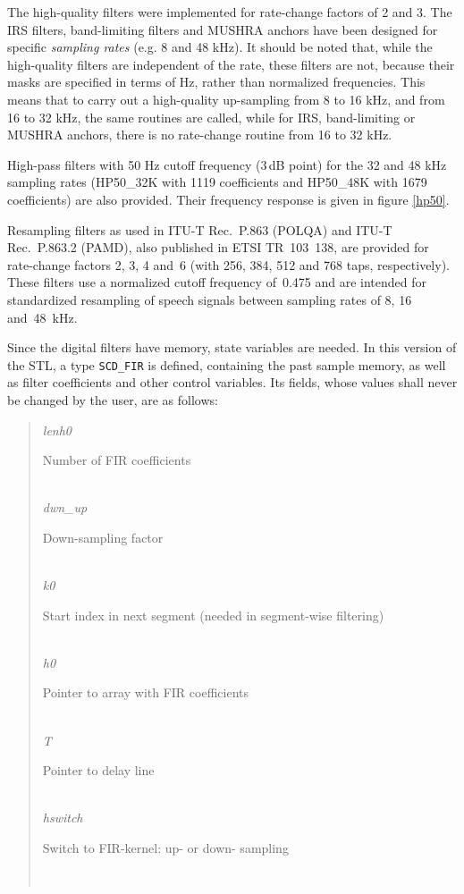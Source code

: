 The high-quality filters were implemented for rate-change factors
of 2 and 3. The IRS filters, band-limiting filters and MUSHRA
anchors have been designed for specific {\em sampling rates} (e.g.
8 and 48 kHz). It should be noted that, while the high-quality
filters are independent of the rate, these filters are not,
because their masks are specified in terms of Hz, rather than
normalized frequencies. This means that to carry out a
high-quality up-sampling from 8 to 16 kHz, and from 16 to 32 kHz,
the same routines are called, while for IRS, band-limiting or
MUSHRA anchors, there is no rate-change routine from 16 to 32 kHz.

High-pass filters with 50 Hz cutoff frequency (3\,dB point) for the 32 and 48 kHz sampling rates (HP50\_32K with 1119 coefficients and HP50\_48K with 1679 coefficients) are also provided. Their frequency response is given in figure \ref{hp50}.

Resampling filters as used in ITU-T Rec.\ P.863 (POLQA) and ITU-T Rec.\ P.863.2 (PAMD), also published in ETSI TR~103~138, are provided for rate-change factors 2, 3, 4 and~6 (with 256, 384, 512 and 768 taps, respectively). These filters use a normalized cutoff frequency of~0.475 and are intended for standardized resampling of speech signals between sampling rates of 8, 16 and~48~kHz.

Since the digital filters have memory, state variables are needed. In
this version of the STL, a type {\tt SCD\_FIR} is defined, containing the past
sample memory, as well as filter coefficients and other control
variables. Its fields, whose values shall never be changed by the
user, are as follows:
\begin{quote} \normalsize
 {\em lenh0}    \dotfill \parbox{110mm}{\SF Number of FIR coefficients}\\
 {\em dwn\_up}  \dotfill \ \parbox{110mm}{\SF Down-sampling factor }\\
 {\em k0}       \dotfill \parbox[t]{110mm}{\SF Start index in next segment
                                       (needed in segment-wise filtering) }\\
 {\em h0}       \dotfill \parbox{110mm}{\SF Pointer to array with FIR
                                          coefficients }\\
 {\em T}        \dotfill \parbox{110mm}{\SF Pointer to delay line }\\
 {\em hswitch}  \dotfill \parbox{110mm}{\SF Switch to FIR-kernel: up- or down-
                                          sampling }\\
\end{quote}

